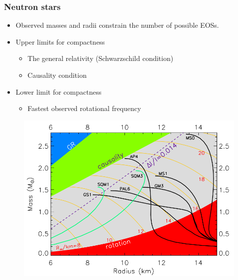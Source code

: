 \documentclass{beamer}
\begin{document}
\begin{frame}
\frametitle{Neutron stars}
\begin{minipage}{0.5\textwidth}
\begin{itemize}
\item Observed masses and radii constrain the number of possible EOSs.
\item Upper limits for compactness
\begin{itemize}
\item The general relativity (Schwarzschild condition)
\item Causality condition
\end{itemize}
\item Lower limit for compactness
\begin{itemize}
\item Fastest observed rotational frequency 
\end{itemize}
\end{itemize}
\end{minipage}%
\begin{minipage}{.5\textwidth}
\begin{figure}
\includegraphics[width=1.1\linewidth]{eos_mr.png}
\end{figure}
\end{minipage}
\end{frame}





\end{document}
